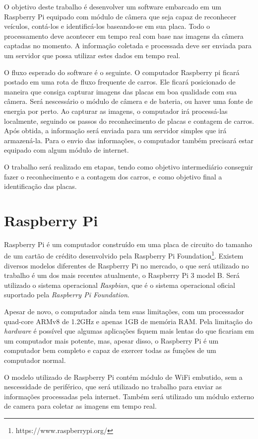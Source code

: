 O objetivo deste trabalho é desenvolver um software embarcado em um Raspberry Pi
equipado com módulo de câmera que seja capaz de reconhecer veículos, contá-los e
identificá-los baseando-se em sua placa. Todo o processamento deve acontecer em
tempo real com base nas imagens da câmera captadas no momento. A informação
coletada e processada deve ser enviada para um servidor que possa utilizar estes
dados em tempo real.

O fluxo esperado do software é o seguinte. O computador Raspberry pi ficará
postado em uma rota de fluxo frequente de carros. Ele ficará posicionado de
maneira que consiga capturar imagens das placas em boa qualidade com sua câmera.
Será nescessário o módulo de câmera e de bateria, ou haver uma fonte de energia
por perto. Ao capturar as imagens, o computador irá processá-las localmente,
seguindo os passos do reconhecimento de placas e contagem de carros.  Após
obtida, a informação será enviada para um servidor simples que irá armazená-la.
Para o envio das informações, o computador também precisará estar equipado com
algum módulo de internet.

O trabalho será realizado em etapas, tendo como objetivo intermediário conseguir
fazer o reconhecimento e a contagem dos carros, e como objetivo final a
identificação das placas.

\section{Raspberry Pi}
\label{sec:raspi}

Raspberry Pi é um computador construído em uma placa de circuito do tamanho de
um cartão de crédito desenvolvido pela Raspberry Pi
Foundation\footnote{https://www.raspberrypi.org/}. Existem diversos modelos diferentes
de Raspberry Pi no mercado, o que será utilizado no trabalho é um dos mais recentes atualmente,
o Raspberry Pi 3 model B. Será utilizado o sistema operacional \emph{Raspbian}, que é o
sistema operacional oficial suportado pela \emph{Raspberry Pi Foundation}.

Apesar de novo, o computador ainda tem suas limitações, com um processador quad-core ARMv8 de
1.2GHz e apenas 1GB de memória RAM. Pela limitação do \emph{hardware} é possível que algumas
aplicações fiquem mais lentas do que ficariam em um computador mais potente, mas, apesar disso,
o Raspberry Pi é um computador bem completo e capaz de exercer todas as funções de um computador normal.

O modelo utilizado de Raspberry Pi contém módulo de WiFi embutido, sem a nescessidade de
periférico, que será utilizado no trabalho para enviar as informações processadas pela
internet. Também será utilizado um módulo externo de camera para coletar as imagens em tempo real.

